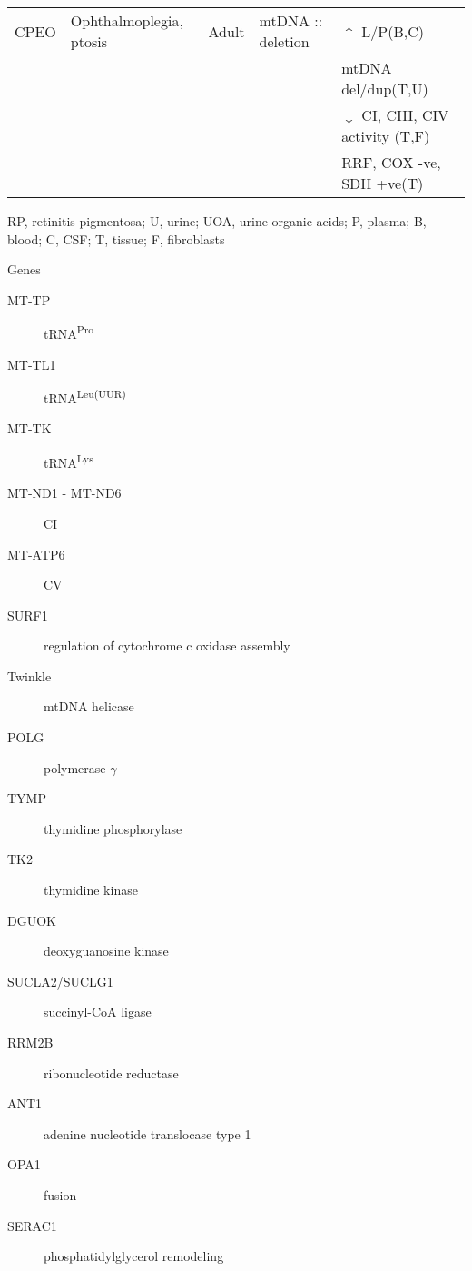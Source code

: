 \documentclass[landscape]{article}
\begin{document}
\begin{longtable}{lllll}
\hline
CPEO & Ophthalmoplegia, ptosis & Adult & mtDNA :: deletion & \(\uparrow\) L/P(B,C)\\
 &  &  &  & mtDNA del/dup(T,U)\\
 &  &  &  & \(\downarrow\) CI, CIII, CIV activity (T,F)\\
 &  &  &  & RRF, COX -ve, SDH +ve(T)\\
\hline
\end{longtable}

\begin{description}
\item[{Abbreviations}] RP, retinitis pigmentosa; U, urine; UOA, urine organic acids; P, plasma; B, blood; C, CSF; T, tissue; F, fibroblasts
\item Genes
\begin{description}
\item[{MT-TP}] tRNA\textsuperscript{Pro}
\item[{MT-TL1}] tRNA\textsuperscript{Leu(UUR)}
\item[{MT-TK}] tRNA\textsuperscript{Lys}
\item[{MT-ND1 - MT-ND6}] CI
\item[{MT-ATP6}] CV
\item[{SURF1}] regulation of cytochrome c oxidase assembly
\item[{Twinkle}] mtDNA helicase
\item[{POLG}] polymerase \(\gamma\)
\item[{TYMP}] thymidine phosphorylase
\item[{TK2}] thymidine kinase
\item[{DGUOK}] deoxyguanosine kinase
\item[{SUCLA2/SUCLG1}] succinyl-CoA ligase
\item[{RRM2B}] ribonucleotide reductase
\item[{ANT1}] adenine nucleotide translocase type 1
\item[{OPA1}] fusion
\item[{SERAC1}] phosphatidylglycerol remodeling
\end{description}
\end{description}
\end{document}
